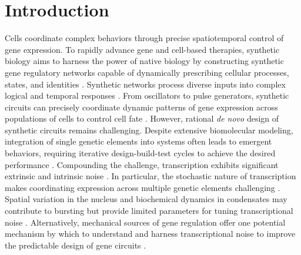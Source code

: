 \documentclass[11pt]{article} %
\begin{document}
\section{Introduction}
Cells coordinate complex behaviors through precise spatiotemporal control of gene expression. To rapidly advance gene and cell-based therapies, synthetic biology aims to harness the power of native biology by constructing synthetic gene regulatory networks capable of dynamically prescribing cellular processes, states, and identities \parencite{chenSyntheticBiologyAdvancing2012,beitzSyntheticGeneCircuits2022,purnickSecondWaveSynthetic2009,elowitzBuildLifeUnderstand2010}.
Synthetic networks process diverse inputs into complex logical and temporal responses \parencite{weinbergLargescaleDesignRobust2017,xieMultiInputRNAiBasedLogic2011,taborSyntheticGeneticEdge2009}.
From oscillators to pulse generators, synthetic circuits can  precisely coordinate dynamic patterns of gene expression across populations of cells to control cell fate \parencite{gardnerConstructionGeneticToggle2000,elowitzSyntheticOscillatoryNetwork2000,strickerFastRobustTunable2008,daninoSynchronizedQuorumGenetic2010,maSyntheticMammalianSignaling2022,parkEngineeringEpigeneticRegulation2019,bashorUsingEngineeredScaffold2008,gallowayDynamicallyReshapingSignaling2013}.
However, rational \textit{de novo} design of synthetic circuits remains challenging. Despite extensive biomolecular modeling, integration of single genetic elements into systems often leads to emergent behaviors, requiring iterative design-build-test cycles to achieve the desired performance \parencite{jonesEndoribonucleasebasedFeedforwardController2020,freiCharacterizationMitigationGene2020,qianResourceCompetitionShapes2017}. Compounding the challenge, transcription exhibits significant extrinsic and intrinsic noise \parencite{toNoiseCanInduce2010,zopfCellCycleDependenceTranscription2013,desaiDNArepairPathwayCan2021}.
In particular, the stochastic nature of transcription makes coordinating expression across multiple genetic elements challenging \parencite{rodriguezIntrinsicDynamicsHuman2019,rodriguezTranscriptionLivingCells2020,quartonUncouplingGeneExpression2020}.
Spatial variation in the nucleus and biochemical dynamics in condensates may contribute to bursting but provide limited parameters for tuning transcriptional noise \parencite{henningerRNAMediatedFeedbackControl2020,guoPolIIPhosphorylation2019}.
Alternatively, mechanical sources of gene regulation offer one potential mechanism by which to understand and harness transcriptional noise to improve the predictable design of gene circuits \parencite{johnstoneEngineeringCellularSymphonies2021,anconaTranscriptionalBurstsNonequilibrium2019a,kimLongDistanceCooperativeAntagonistic2019,elhoudaiguiBacterialGenomeArchitecture2019a,meyerTorsionMediatedInteractionAdjacent2014}.
\end{document}

